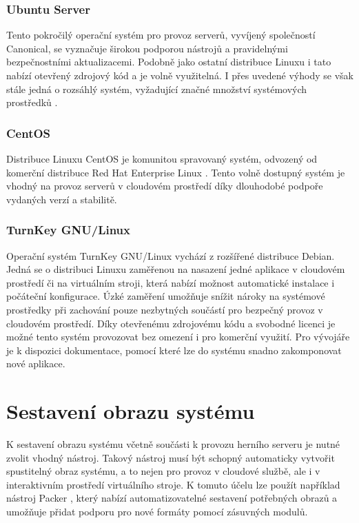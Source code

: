 \subsubsection{Ubuntu Server}

Tento pokročilý operační systém pro provoz serverů, vyvíjený společností Canonical, se vyznačuje širokou podporou nástrojů a pravidelnými bezpečnostními
aktualizacemi. Podobně jako ostatní distribuce Linuxu i tato nabízí otevřený zdrojový kód a je volně využitelná. I přes uvedené výhody se však stále jedná o
rozsáhlý systém, vyžadující značné množství systémových prostředků \cite{ubuntu_server_reqs}.

\subsubsection{CentOS}

Distribuce Linuxu CentOS je komunitou spravovaný systém, odvozený od komerční distribuce Red Hat Enterprise Linux \cite{centos}. Tento volně dostupný systém
je vhodný na provoz serverů v cloudovém prostředí díky dlouhodobé podpoře vydaných verzí a stabilitě. 

\subsubsection{TurnKey GNU/Linux}

Operační systém TurnKey GNU/Linux \cite{linuxgsm} vychází z rozšířené distribuce Debian. Jedná se o distribuci Linuxu zaměřenou na nasazení jedné aplikace v cloudovém prostředí
či na virtuálním stroji, která nabízí možnost automatické instalace i počáteční konfigurace. Úzké zaměření umožňuje snížit nároky na systémové prostředky
při zachování pouze nezbytných součástí pro bezpečný provoz v cloudovém prostředí. Díky otevřenému zdrojovému kódu a svobodné licenci je možné
tento systém provozovat bez omezení i pro komerční využití. Pro vývojáře je k dispozici dokumentace, pomocí které lze do systému snadno zakomponovat
nové aplikace.

\section{Sestavení obrazu systému}

K sestavení obrazu systému včetně součásti k provozu herního serveru je nutné zvolit vhodný nástroj. Takový nástroj
musí být schopný automaticky vytvořit spustitelný obraz systému, a to nejen pro provoz v cloudové službě, ale i
v interaktivním prostředí virtuálního stroje. K tomuto účelu lze použít například nástroj Packer \cite{packer},
který nabízí automatizovatelné sestavení potřebných obrazů a umožňuje
přidat podporu pro nové formáty pomocí zásuvných modulů.

